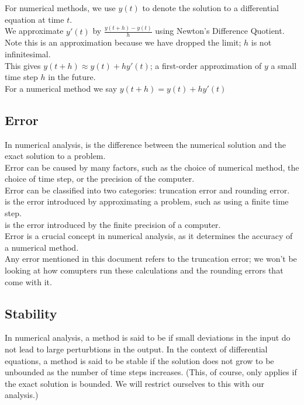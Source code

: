 \par For numerical methods, we use $y(t)$ to denote the solution to a differential equation at time $t$.\\
We approximate $y'(t)$ by $\frac{y(t+h) - y(t)}{h}$ using Newton's Difference Quotient.\\
Note this is an approximation because we have dropped the limit; $h$ is not infinitesimal.\\
This gives $y(t + h) \approx y(t) + h y'(t)$; a first-order approximation of $y$ a small time step $h$ in the future.\\
For a numerical method we say $y(t + h) = y(t) + h y'(t)$ 

\subsection{Error}
\par In numerical analysis,  is the difference between the numerical solution and the exact solution to a problem.\\
Error can be caused by many factors, such as the choice of numerical method, the choice of time step, or the precision of the computer.\\
Error can be classified into two categories: truncation error and rounding error.\\
 is the error introduced by approximating a problem, such as using a finite time step.\\
 is the error introduced by the finite precision of a computer.\\
Error is a crucial concept in numerical analysis, as it determines the accuracy of a numerical method.\\
Any error mentioned in this document refers to the truncation error; we won't be looking at how comupters run these calculations and the rounding errors that come with it.

\subsection{Stability}
\par In numerical analysis, a method is said to be  if small deviations in the input do not lead to large perturbtions in the output.
In the context of differential equations, a method is said to be stable if the solution does not grow to be unbounded as the number of time steps increases. (This, of course, only applies if the exact solution is bounded. We will restrict ourselves to this with our analysis.)

